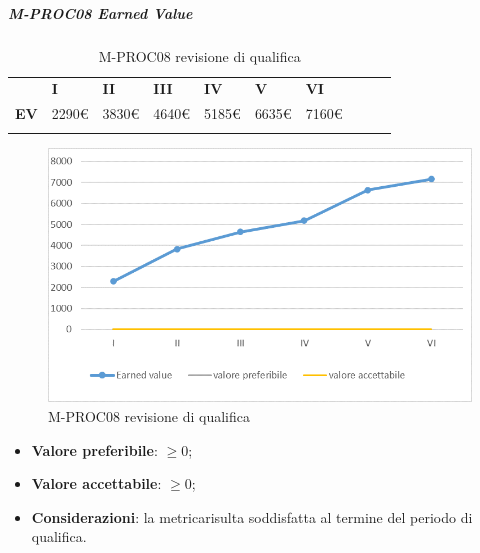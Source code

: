 \subparagraph{M-PROC08 Earned Value} \mbox{}
\begin{longtable}[H!] {						
		>{}p{35mm}  		
		>{}p{12mm}
		>{}p{12mm}		
		>{}p{12mm}		
		>{}p{12mm}		
		>{}p{12mm}		
		>{}p{12mm}
		>{}p{12mm}
		>{}p{12mm}
		>{}p{12mm}
	}
	\rowcolor{gray!50}
	\textbf{} & \textbf{I} & \textbf{II} & \textbf{III} & \textbf{IV} & \textbf{V} & \textbf{VI} \TBstrut \\ [2mm]
	\textbf{EV} & 2290\euro & 3830\euro & 4640\euro & 5185\euro & 6635\euro & 7160\euro \TBstrut \\ [2mm]
	\rowcolor{white}
	\caption{M-PROC08 revisione di qualifica}
\end{longtable}
\begin{figure}[H] 	
	\includegraphics[width=\linewidth]{./img/grafici/RQ8.png}	
	\caption{M-PROC08 revisione di qualifica}	
\end{figure}
\begin{itemize}
	\item \textbf{Valore preferibile}: $\ge0$;
	\item \textbf{Valore accettabile}: $\ge0$;
	\item \textbf{Considerazioni}: la metrica\glosp risulta soddisfatta al termine del periodo di qualifica.
\end{itemize}

